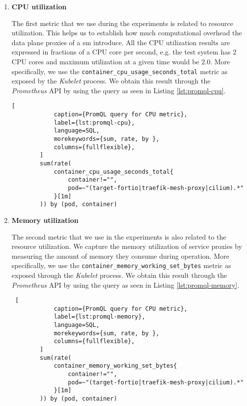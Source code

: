 \begin{enumerate}[label=\textbf{M\arabic*}, leftmargin=3\parindent]
    \item \textbf{CPU utilization}
    \label{exp:metric:1}
    
    The first metric that we use during the experiments is related to resource utilization. This helps us to establish how much computational overhead the data plane proxies of a \gls{sm} introduce. All the CPU utilization results are expressed in fractions of a CPU core per second, e.g. the test system has 2 CPU cores and maximum utilization at a given time would be $2.0$. More specifically, we use the \verb+container_cpu_usage_seconds_total+ metric as exposed by the \textit{Kubelet} process. We obtain this result through the \textit{Prometheus} API by using the query as seen in Listing \ref{lst:promql-cpu}.
    
    \begin{minipage}{\linewidth}
        \begin{lstlisting}[
            caption={PromQL query for CPU metric},
            label={lst:promql-cpu},
            language=SQL,
            morekeywords={sum, rate, by },
            columns={fullflexible},
        ] 
        sum(rate(
            container_cpu_usage_seconds_total{
                container!="",
                pod=~"(target-fortio|traefik-mesh-proxy|cilium).*"
            }[1m]
        )) by (pod, container)
        \end{lstlisting}
    \end{minipage}

    \item \textbf{Memory utilization}
    \label{exp:metric:2}
    
    The second metric that we use in the experiments is also related to the resource utilization. We capture the memory utilization of service proxies by measuring the amount of memory they consume during operation. More specifically, we use the \verb+container_memory_working_set_bytes+ metric as exposed through the \textit{Kubelet} process. We obtain this result through the \textit{Prometheus} API by using the query as seen in Listing \ref{lst:promql-memory}.
    
    \begin{minipage}{\linewidth}
        \begin{lstlisting} [
            caption={PromQL query for CPU metric},
            label={lst:promql-memory},
            language=SQL,
            morekeywords={sum, rate, by },
            columns={fullflexible},
        ] 
        sum(rate(
            container_memory_working_set_bytes{
                container!="",
                pod=~"(target-fortio|traefik-mesh-proxy|cilium).*"
            }[1m]
        )) by (pod, container)
        \end{lstlisting}
    \end{minipage}


\end{enumerate}
